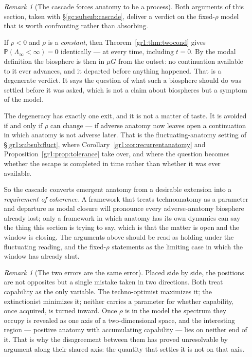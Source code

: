 \documentclass[11pt]{article}
\numberwithin{equation}{section}
\theoremstyle{plain}
\theoremstyle{definition}
\theoremstyle{remark}
\newtheorem{remark}[theorem]{Remark}
\newcommand{\PP}{\mathbb{P}}
\begin{document}
\begin{remark}[The cascade forces anatomy to be a process]
\label{hr:rem:forcesprocess}
Both arguments of this section, taken with
\S\ref{gc:subsub:cascade}, deliver a verdict on the fixed-$\rho$ model
that is worth confronting rather than absorbing.

If $\rho<0$ and $\rho$ is a \emph{constant}, then
Theorem~\ref{gr1:thm:twocond} gives
$\PP(\Lambda_\infty<\infty)=0$ identically --- at every time, including
$t=0$. By the modal definition the biosphere is then in $\mu G$ from the
outset: no continuation available to it ever advances, and it departed
before anything happened. That is a degenerate verdict. It says the
question of what such a biosphere should do was settled before it was
asked, which is not a claim about biospheres but a symptom of the
model.

The degeneracy has exactly one exit, and it is not a matter of taste.
It is avoided if and only if $\rho$ can change --- if adverse anatomy
now leaves open a continuation in which anatomy is not adverse later.
That is the fluctuating-anatomy setting of
\S\ref{gr1:subsub:fluct}, where
Corollary~\ref{gr1:cor:recurrentanatomy} and
Proposition~\ref{gr1:prop:tolerance} take over, and where the question
becomes whether the escape is completed in time rather than whether it
was ever available.

So the cascade converts emergent anatomy from a desirable extension
into a \emph{requirement of coherence}. A framework that treats
technoanatomy as a parameter and departure as modal closure will
pronounce every adverse-anatomy biosphere already lost; only a
framework in which anatomy has its own dynamics can say the thing this
section is trying to say, which is that the matter is open and the
window is closing. The arguments above should be read as holding under
the fluctuating reading, and the fixed-$\rho$ statements as the
limiting case in which the window has already shut.
\end{remark}

\begin{remark}[The two errors are the same error]\label{hr:rem:sameerror}
Placed side by side, the positions are not opposites but a single
mistake taken in two directions. Both treat capability as the only
variable. The techno-optimist maximizes it; the extinctionist minimizes
it; neither carries a parameter for whether capability, once acquired,
is turned inward. Once $\rho$ is in the model the spectrum they occupy
is revealed as one axis of a two-dimensional space, and the interesting
region --- positive anatomy with accumulating capability --- lies on
neither end of it. That is why the disagreement between them has proved
unresolvable by argument along their shared axis: the quantity that
settles it is not on that axis.
\end{remark}
\end{document}
